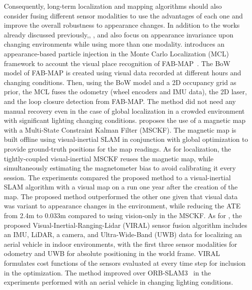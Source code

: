 Consequently, long-term localization and mapping algorithms should also consider fusing different sensor modalities to use the advantages of each one and improve the overall robustness to appearance changes. In addition to the works already discussed previously,\cite{pérez-et-al:2015:y}, \cite{coulin-et-al:2022:3136241}, and \cite{nguyen-et-al:2022:3094157} also focus on appearance invariance upon changing environments while using more than one modality.
\cite{pérez-et-al:2015:y} introduces an appearance-based particle injection in the Monte Carlo Localization (MCL) framework to account the visual place recognition of FAB-MAP~\cite{discussion:fab-map}. The BoW model of FAB-MAP is created using visual data recorded at different hours and changing conditions. Then, using the BoW model and a 2D occupancy grid as prior, the MCL fuses the odometry (wheel encoders and IMU data), the 2D laser, and the loop closure detection from FAB-MAP. The method did not need any manual recovery even in the case of global localization in a crowded environment with significant lighting changing conditions.
\cite{coulin-et-al:2022:3136241} proposes the use of a magnetic map with a Multi-State Constraint Kalman Filter (MSCKF). The magnetic map is built offline using visual-inertial SLAM in conjunction with global optimization to provide ground-truth positions for the map readings. As for localization, the tightly-coupled visual-inertial MSCKF reuses the magnetic map, while simultaneously estimating the magnetometer bias to avoid calibrating it every session. The experiments compared the proposed method to a visual-inertial SLAM algorithm with a visual map on a run one year after the creation of the map. The proposed method outperformed the other one given that visual data was variant to appearance changes in the environment, while reducing the ATE from 2.4m to 0.033m compared to using vision-only in the MSCKF.
As for \cite{nguyen-et-al:2022:3094157}, the proposed Visual-Inertial-Ranging-Lidar (VIRAL) sensor fusion algorithm includes an IMU, LiDAR, a camera, and Ultra-Wide-Band (UWB) data for localizing an aerial vehicle in indoor environments, with the first three sensor modalities for odometry and UWB for absolute positioning in the world frame. VIRAL formulates cost functions of the sensors evaluated at every time step for inclusion in the optimization. The method improved over ORB-SLAM3~\parencite{discussion:orb-slam3} in the experiments performed with an aerial vehicle in changing lighting conditions.





